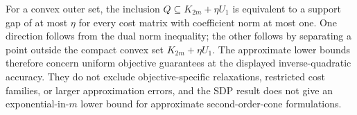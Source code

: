 For a convex outer set, the inclusion $Q\subseteq K_{2m}+\eta U_1$
is equivalent to a support gap of at most $\eta$ for every cost
matrix with coefficient norm at most one. One direction follows from
the dual norm inequality; the other follows by separating a point
outside the compact convex set $K_{2m}+\eta U_1$. The approximate
lower bounds therefore concern uniform objective guarantees at the
displayed inverse-quadratic accuracy. They do not exclude
objective-specific relaxations, restricted cost families, or larger
approximation errors, and the SDP result does not give an
exponential-in-$m$ lower bound for approximate second-order-cone
formulations.
